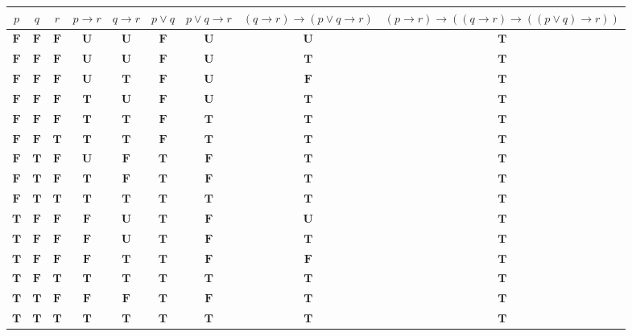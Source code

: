 \documentclass[12pt]{article}
\begin{document}
{\newpage

\begin{longtable}[]{@{}ccccccccc@{}}
\toprule \(p\) & \(q\) & \(r\) & \(p \to r\) & \(q \to r\) & \(p \lor q\) & \(p \lor q \to r\) & \((q \to r) \to (p \lor q \to r)\) & \((p \to r) \to ((q \to r) \to	((p \lor q) \to r))\) \tabularnewline
\midrule
\endhead
 \(\textbf{F}\)  &  \(\textbf{F}\)  &  \(\textbf{F}\)  &  \(\textbf{U}\)  &  \(\textbf{U}\)  &  \(\textbf{F}\)  &  \(\textbf{U}\)  &  \(\textbf{U}\)  &  \(\textbf{T}\) \tabularnewline
 \(\textbf{F}\)  &  \(\textbf{F}\)  &  \(\textbf{F}\)  &  \(\textbf{U}\)  &  \(\textbf{U}\)  &  \(\textbf{F}\)  &  \(\textbf{U}\)  &  \(\textbf{T}\)  &  \(\textbf{T}\) \tabularnewline
 \(\textbf{F}\)  &  \(\textbf{F}\)  &  \(\textbf{F}\)  &  \(\textbf{U}\)  &  \(\textbf{T}\)  &  \(\textbf{F}\)  &  \(\textbf{U}\)  &  \(\textbf{F}\)  &  \(\textbf{T}\) \tabularnewline
 \(\textbf{F}\)  &  \(\textbf{F}\)  &  \(\textbf{F}\)  &  \(\textbf{T}\)  &  \(\textbf{U}\)  &  \(\textbf{F}\)  &  \(\textbf{U}\)  &  \(\textbf{T}\)  &  \(\textbf{T}\) \tabularnewline
 \(\textbf{F}\)  &  \(\textbf{F}\)  &  \(\textbf{F}\)  &  \(\textbf{T}\)  &  \(\textbf{T}\)  &  \(\textbf{F}\)  &  \(\textbf{T}\)  &  \(\textbf{T}\)  &  \(\textbf{T}\) \tabularnewline
 \(\textbf{F}\)  &  \(\textbf{F}\)  &  \(\textbf{T}\)  &  \(\textbf{T}\)  &  \(\textbf{T}\)  &  \(\textbf{F}\)  &  \(\textbf{T}\)  &  \(\textbf{T}\)  &  \(\textbf{T}\) \tabularnewline
 \(\textbf{F}\)  &  \(\textbf{T}\)  &  \(\textbf{F}\)  &  \(\textbf{U}\)  &  \(\textbf{F}\)  &  \(\textbf{T}\)  &  \(\textbf{F}\)  &  \(\textbf{T}\)  &  \(\textbf{T}\) \tabularnewline
 \(\textbf{F}\)  &  \(\textbf{T}\)  &  \(\textbf{F}\)  &  \(\textbf{T}\)  &  \(\textbf{F}\)  &  \(\textbf{T}\)  &  \(\textbf{F}\)  &  \(\textbf{T}\)  &  \(\textbf{T}\) \tabularnewline
 \(\textbf{F}\)  &  \(\textbf{T}\)  &  \(\textbf{T}\)  &  \(\textbf{T}\)  &  \(\textbf{T}\)  &  \(\textbf{T}\)  &  \(\textbf{T}\)  &  \(\textbf{T}\)  &  \(\textbf{T}\) \tabularnewline
 \(\textbf{T}\)  &  \(\textbf{F}\)  &  \(\textbf{F}\)  &  \(\textbf{F}\)  &  \(\textbf{U}\)  &  \(\textbf{T}\)  &  \(\textbf{F}\)  &  \(\textbf{U}\)  &  \(\textbf{T}\) \tabularnewline
 \(\textbf{T}\)  &  \(\textbf{F}\)  &  \(\textbf{F}\)  &  \(\textbf{F}\)  &  \(\textbf{U}\)  &  \(\textbf{T}\)  &  \(\textbf{F}\)  &  \(\textbf{T}\)  &  \(\textbf{T}\) \tabularnewline
 \(\textbf{T}\)  &  \(\textbf{F}\)  &  \(\textbf{F}\)  &  \(\textbf{F}\)  &  \(\textbf{T}\)  &  \(\textbf{T}\)  &  \(\textbf{F}\)  &  \(\textbf{F}\)  &  \(\textbf{T}\) \tabularnewline
 \(\textbf{T}\)  &  \(\textbf{F}\)  &  \(\textbf{T}\)  &  \(\textbf{T}\)  &  \(\textbf{T}\)  &  \(\textbf{T}\)  &  \(\textbf{T}\)  &  \(\textbf{T}\)  &  \(\textbf{T}\) \tabularnewline
 \(\textbf{T}\)  &  \(\textbf{T}\)  &  \(\textbf{F}\)  &  \(\textbf{F}\)  &  \(\textbf{F}\)  &  \(\textbf{T}\)  &  \(\textbf{F}\)  &  \(\textbf{T}\)  &  \(\textbf{T}\) \tabularnewline
 \(\textbf{T}\)  &  \(\textbf{T}\)  &  \(\textbf{T}\)  &  \(\textbf{T}\)  &  \(\textbf{T}\)  &  \(\textbf{T}\)  &  \(\textbf{T}\)  &  \(\textbf{T}\)  &  \(\textbf{T}\) \tabularnewline
\bottomrule
\end{longtable}


}
\end{document}
